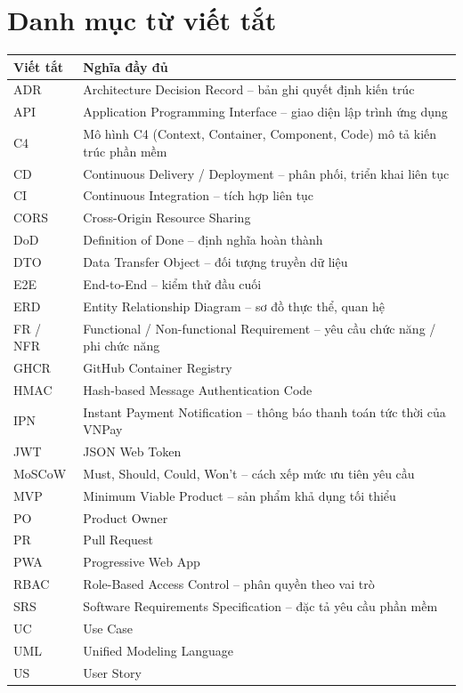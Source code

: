 \section*{Danh mục từ viết tắt}
\begin{longtable}{@{}p{3cm}p{11cm}@{}}
\toprule
\textbf{Viết tắt} & \textbf{Nghĩa đầy đủ} \\ \midrule \endhead
ADR & Architecture Decision Record -- bản ghi quyết định kiến trúc \\
API & Application Programming Interface -- giao diện lập trình ứng dụng \\
C4 & Mô hình C4 (Context, Container, Component, Code) mô tả kiến trúc phần mềm \\
CD & Continuous Delivery / Deployment -- phân phối, triển khai liên tục \\
CI & Continuous Integration -- tích hợp liên tục \\
CORS & Cross-Origin Resource Sharing \\
DoD & Definition of Done -- định nghĩa hoàn thành \\
DTO & Data Transfer Object -- đối tượng truyền dữ liệu \\
E2E & End-to-End -- kiểm thử đầu cuối \\
ERD & Entity Relationship Diagram -- sơ đồ thực thể, quan hệ \\
FR / NFR & Functional / Non-functional Requirement -- yêu cầu chức năng / phi chức năng \\
GHCR & GitHub Container Registry \\
HMAC & Hash-based Message Authentication Code \\
IPN & Instant Payment Notification -- thông báo thanh toán tức thời của VNPay \\
JWT & JSON Web Token \\
MoSCoW & Must, Should, Could, Won't -- cách xếp mức ưu tiên yêu cầu \\
MVP & Minimum Viable Product -- sản phẩm khả dụng tối thiểu \\
PO & Product Owner \\
PR & Pull Request \\
PWA & Progressive Web App \\
RBAC & Role-Based Access Control -- phân quyền theo vai trò \\
SRS & Software Requirements Specification -- đặc tả yêu cầu phần mềm \\
UC & Use Case \\
UML & Unified Modeling Language \\
US & User Story \\
\bottomrule
\end{longtable}

